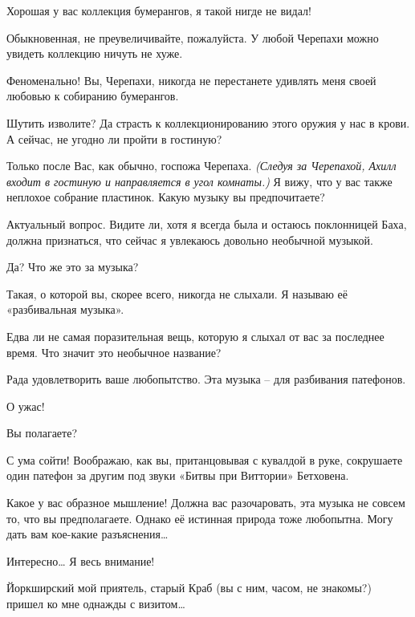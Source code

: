 \documentclass[../main.tex]{subfiles}
\begin{document}

\begin{dialogue}

 {\Large Х}орошая у вас коллекция бумерангов, я такой нигде не видал!

 Обыкновенная, не преувеличивайте, пожалуйста. У любой Черепахи можно увидеть коллекцию ничуть не хуже.

 Феноменально! Вы, Черепахи, никогда не перестанете удивлять меня своей любовью к собиранию бумерангов.

 Шутить изволите? Да страсть к коллекционированию этого оружия у нас в крови. А сейчас, не угодно ли пройти в гостиную?

 Только после Вас, как обычно, госпожа Черепаха. \emph{(Следуя за Черепахой, Ахилл входит в гостиную и направляется в угол комнаты.)} Я вижу, что у вас также неплохое собрание пластинок. Какую музыку вы предпочитаете?

 Актуальный вопрос. Видите ли, хотя я всегда была и остаюсь поклонницей Баха, должна признаться, что сейчас я увлекаюсь довольно необычной музыкой.

 Да? Что же это за музыка?

 Такая, о которой вы, скорее всего, никогда не слыхали. Я называю её «разбивальная музыка».

 Едва ли не самая поразительная вещь, которую я слыхал от вас за последнее время. Что значит это необычное название?

 Рада удовлетворить ваше любопытство. Эта музыка \--- для разбивания патефонов.

 О ужас!

 Вы полагаете?

 С ума сойти! Воображаю, как вы, пританцовывая с кувалдой в руке, сокрушаете один патефон за другим под звуки «Битвы при Виттории» Бетховена.

 Какое у вас образное мышление! Должна вас разочаровать, эта музыка не совсем то, что вы предполагаете. Однако её истинная природа тоже любопытна. Могу дать вам кое-какие разъяснения\ldots{}

 Интересно\ldots{} Я весь внимание!

 Йоркширский мой приятель, старый Краб (вы с ним, часом, не знакомы?) пришел ко мне однажды с визитом\ldots{}


\end{dialogue}
\end{document}
